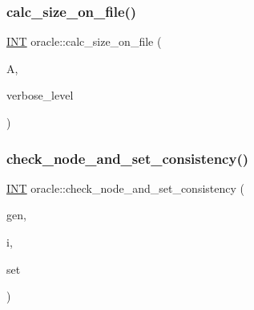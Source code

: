 \mbox{\label{classoracle_a1adfe5e7924b30011fa1c1b3275a44c2}} 
\subsubsection{\texorpdfstring{calc\+\_\+size\+\_\+on\+\_\+file()}{calc\_size\_on\_file()}}
{\footnotesize\ttfamily \mbox{\hyperlink{galois_8h_a09fddde158a3a20bd2dcadb609de11dc}{I\+NT}} oracle\+::calc\+\_\+size\+\_\+on\+\_\+file (\begin{DoxyParamCaption}\item[{\mbox{\hyperlink{classaction}{action}} $\ast$}]{A,  }\item[{\mbox{\hyperlink{galois_8h_a09fddde158a3a20bd2dcadb609de11dc}{I\+NT}}}]{verbose\+\_\+level }\end{DoxyParamCaption})}

\mbox{\label{classoracle_aef948ef06e8bd1a94863ad70f053adaa}} 
\subsubsection{\texorpdfstring{check\+\_\+node\+\_\+and\+\_\+set\+\_\+consistency()}{check\_node\_and\_set\_consistency()}}
{\footnotesize\ttfamily \mbox{\hyperlink{galois_8h_a09fddde158a3a20bd2dcadb609de11dc}{I\+NT}} oracle\+::check\+\_\+node\+\_\+and\+\_\+set\+\_\+consistency (\begin{DoxyParamCaption}\item[{\mbox{\hyperlink{classgenerator}{generator}} $\ast$}]{gen,  }\item[{\mbox{\hyperlink{galois_8h_a09fddde158a3a20bd2dcadb609de11dc}{I\+NT}}}]{i,  }\item[{\mbox{\hyperlink{galois_8h_a09fddde158a3a20bd2dcadb609de11dc}{I\+NT}} $\ast$}]{set }\end{DoxyParamCaption})}

\mbox{\label{classoracle_a7046977fe379fb4218af655634caa958}} 
